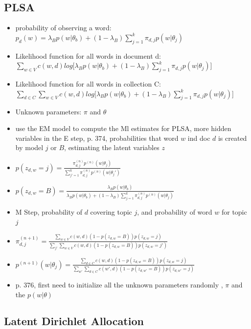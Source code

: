 \documentclass[11pt,a4paper,english,oneside]{book}
\numberwithin{equation}{chapter}
\begin{document}
\subsection{PLSA}

\begin{itemize}
	\item probability of observing a word: $p_d(w) = \lambda_Bp(w|\theta_b) + (1-\lambda_B)\sum_{j=1}^{k}\pi_{d,j}p(w|\theta_j)$
	\item Likelihood function for all words in document d: $\sum_{w \in V} c(w,d) log[\lambda_Bp(w|\theta_b) + (1-\lambda_B)\sum_{j=1}^{k}\pi_{d,j}p(w|\theta_j)$]
	\item Likelihood function for all words in collection C: $\sum_{d \in C}\sum_{w \in V} c(w,d) log[\lambda_Bp(w|\theta_b) + (1-\lambda_B)\sum_{j=1}^{k}\pi_{d,j}p(w|\theta_j)$]
	\item Unknown parameters: $\pi$ and $\theta$
	\item use the EM model to compute the Ml estimates for PLSA, more hidden variables in the E step, p. 374, probabilities that word $w$ ind doc $d$ is created by model $j$ or $B$, estimating the latent variables $z$
	\item $p(z_{d,w}=j)=\frac{\pi_{d,j}^{(n)}p^{(n)}(w|\theta_j)}{\sum_{j'=1}^{k}\pi_{d,j}^{(n)}p^{(n)}(w|\theta_j')}$
	\item $p(z_{d,w}=B)=\frac{\lambda_Bp(w|\theta_b)}{\lambda_Bp(w|\theta_b)+(1-\lambda_B)\sum_{j=1}^{k}\pi_{d,j}^{(n)}p^{(n)}(w|\theta_j)}$
	\item M Step, probability of $d$ covering topic $j$, and probability of word $w$ for topic $j$
	\item $\pi_{d,j}^{(n+1)}=\frac{\sum_{w \in V}c(w,d)(1-p(z_{d,w} =B))p(z_{d,w}=j)}{\sum_{j'}\sum_{w \in V}c(w,d)(1-p(z_{d,w} =B))p(z_{d,w}=j')}$
	\item $p^{(n+1)}(w|\theta_j)=\frac{\sum_{d \in C}c(w,d)(1-p(z_{d,w} =B))p(z_{d,w}=j)}{\sum_{w'}\sum_{d \in C}c(w',d)(1-p(z_{d,w'} =B))p(z_{d,w'}=j)}$
	\item p. 376, first need to initialize all the unknown parameters randomly , $\pi$ and the $p(w|\theta)$
	
\end{itemize}

\subsection{Latent Dirichlet Allocation}\label{LDA}
\end{document}
